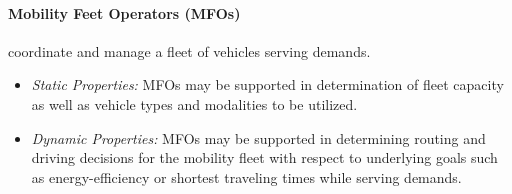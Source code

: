 \documentclass[a4paper,twoside]{article}
\begin{document}
\paragraph{Mobility Feet Operators (MFOs)} coordinate and manage a fleet of vehicles serving demands. 
\begin{itemize}
	\item \textit{Static Properties:} %
	MFOs may be supported in determination of fleet capacity as well as vehicle types and modalities to be utilized.
	\item \textit{Dynamic Properties:} %
	MFOs may be supported in  determining routing and driving decisions for the mobility fleet with respect to underlying goals such as energy-efficiency or shortest traveling times while serving demands.
\end{itemize}
	
	
		

	
	
\end{document}
